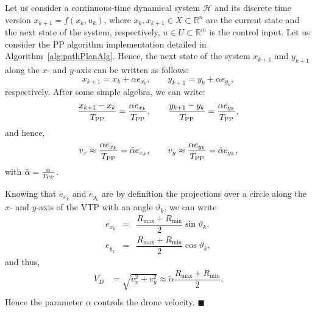 \documentclass[a4paper,twocolumn,10pt]{article}
\begin{document}
    \begin{appendix}
        \label{append}
        
        Let us consider a continuous-time dynamical system $\mathcal{H}$ and its discrete time version 
        $x_{k+1}=f(x_k,u_k)$, where $x_k, x_{k+1} \in X \subset \mathbb{R}^n$ are the current state and 
        the next state of the system, respectively, $u \in U \subset \mathbb{R}^m$ is the control 
        input. Let us consider the PP algorithm implementation detailed in 
        Algorithm~\ref{alg:pathPlanAlg}. Hence, the next state of the system $x_{k+1}$ and $y_{k+1}$ 
        along the $x$- and $y$-axis can be written as follows:
        \begin{equation}
            x_{k+1} = x_k + \alpha e_{x_k}, \qquad y_{k+1} = y_k + \alpha e_{y_k},
        \end{equation}
        respectively. After some simple algebra, we can write:
        \begin{equation}
            \dfrac{x_{k+1}-x_k}{T_{\rm PP}} = \dfrac{\alpha e_{x_k}}{T_{\rm PP}}, \qquad 
            \dfrac{y_{k+1}-y_k}{T_{\rm PP}} = \dfrac{\alpha e_{y_k}}{T_{\rm PP}}, 
        \end{equation}
        and hence,
        \begin{equation}
            v_x \approx \dfrac{\alpha e_{x_k}}{T_{\rm PP}} = \tilde{\alpha} e_{x_k}, \qquad 
            v_y  \approx  \dfrac{\alpha e_{y_k}}{T_{\rm PP}} = \tilde{\alpha} e_{y_k},
        \end{equation}
        with $\tilde{\alpha} = \frac{\alpha}{T_{\rm PP}}$.
        
        Knowing that $e_{x_k}$ and $e_{y_k}$ are by definition the projections over a circle along the 
        $x$- and $y$-axis of the VTP with an angle $\vartheta_k$, we can write
        \begin{equation}
            \begin{array}{rll}
                e_{x_k} &=& \dfrac{R_\mathrm{max}+R_\mathrm{min}}{2} \sin{\vartheta_k},\\[10pt]
                e_{y_k} &=& \dfrac{R_\mathrm{max}+R_\mathrm{min}}{2} \cos{\vartheta_k},
            \end{array}
        \end{equation}
        and thus,
        \begin{equation} 
            \begin{split}
                V_D & = \sqrt{v_x^2 + v_y^2} \approx \tilde{\alpha} 
                \dfrac{R_\mathrm{max}+R_\mathrm{min}}{2}. \\
            \end{split}
        \end{equation}
        Hence the parameter $\alpha$ controls the drone velocity. 
        \hspace*{\fill} $\blacksquare$ 
    \end{appendix}
\end{document}
